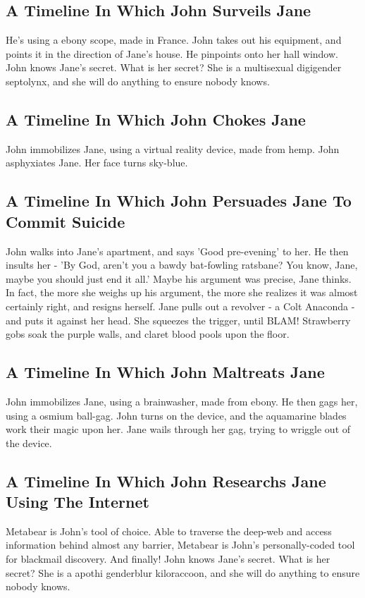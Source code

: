 \documentclass{article}
\begin{document}
\subsection{A Timeline In Which John Surveils Jane}


He's using a ebony scope, made in France.
John takes out his equipment, and points it in the direction of Jane's house. He pinpoints onto her hall window.
John knows Jane's secret. What is her secret? She is a multisexual digigender septolynx, and she will do anything to ensure nobody knows.
\subsection{A Timeline In Which John Chokes Jane}


John immobilizes Jane, using a virtual reality device, made from hemp.
John asphyxiates Jane.
Her face turns sky{-}blue.
\subsection{A Timeline In Which John Persuades Jane To Commit Suicide}


John walks into Jane's apartment, and says 'Good pre{-}evening' to her.
He then insults her {-} 'By God, aren't you a bawdy bat{-}fowling ratsbane?
You know, Jane, maybe you should just end it all.'
Maybe his argument was precise, Jane thinks.
In fact, the more she weighs up his argument, the more she realizes it was almost certainly right, and resigns herself.
Jane pulls out a revolver {-} a Colt Anaconda {-} and puts it against her head.
She squeezes the trigger, until BLAM!
Strawberry gobs soak the purple walls, and claret blood pools upon the floor.
\subsection{A Timeline In Which John Maltreats Jane}


John immobilizes Jane, using a brainwasher, made from ebony.
He then gags her, using a osmium ball{-}gag.
John turns on the device, and the aquamarine blades work their magic upon her.
Jane wails through her gag, trying to wriggle out of the device.
\subsection{A Timeline In Which John Researchs Jane Using The Internet}


Metabear is John's tool of choice. Able to traverse the deep{-}web and access information behind almost any barrier, Metabear is John's personally{-}coded tool for blackmail discovery.
And finally!
John knows Jane's secret. What is her secret? She is a apothi genderblur kiloraccoon, and she will do anything to ensure nobody knows.
\end{document}
